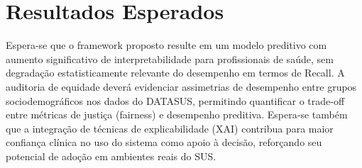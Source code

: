 \documentclass[12pt]{article}
\begin{document}
\section{Resultados Esperados}
Espera-se que o framework proposto resulte em um modelo preditivo com aumento significativo de interpretabilidade para profissionais de saúde, sem degradação estatisticamente relevante do desempenho em termos de Recall. A auditoria de equidade deverá evidenciar assimetrias de desempenho entre grupos sociodemográficos nos dados do DATASUS, permitindo quantificar o trade-off entre métricas de justiça (fairness) e desempenho preditiva. Espera-se também que a integração de técnicas de explicabilidade (XAI) contribua para maior confiança clínica no uso do sistema como apoio à decisão, reforçando seu potencial de adoção em ambientes reais do SUS.







\end{document}
